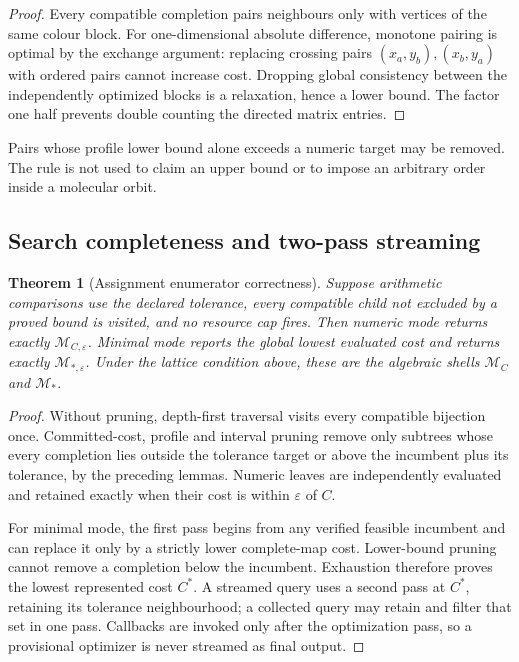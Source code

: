 \documentclass[11pt]{article}
\newtheorem{theorem}{Theorem}[section]
\theoremstyle{definition}
\begin{document}
\begin{proof}
Every compatible completion pairs neighbours only with vertices of the same
colour block.  For one-dimensional absolute difference, monotone pairing is
optimal by the exchange argument: replacing crossing pairs
\((x_a,y_b),(x_b,y_a)\) with ordered pairs cannot increase cost.  Dropping
global consistency between the independently optimized blocks is a
relaxation, hence a lower bound.  The factor one half prevents double counting
the directed matrix entries.
\end{proof}

Pairs whose profile lower bound alone exceeds a numeric target may be removed.
The rule is not used to claim an upper bound or to impose an arbitrary order
inside a molecular orbit.

\subsection{Search completeness and two-pass streaming}

\begin{theorem}[Assignment enumerator correctness]
Suppose arithmetic comparisons use the declared tolerance, every compatible
child not excluded by a proved bound is visited, and no resource cap fires.
Then numeric mode returns exactly \(\mathcal M_{C,\varepsilon}\).  Minimal
mode reports the global lowest evaluated cost and returns exactly
\(\mathcal M_{*,\varepsilon}\).  Under the lattice condition above, these are
the algebraic shells \(\mathcal M_C\) and \(\mathcal M_*\).
\label{thm:si-bnb}
\end{theorem}

\begin{proof}
Without pruning, depth-first traversal visits every compatible bijection once.
Committed-cost, profile and interval pruning remove only subtrees whose every
completion lies outside the tolerance target or above the incumbent plus its
tolerance, by the preceding lemmas.  Numeric leaves are independently
evaluated and retained exactly when their cost is within \(\varepsilon\) of
\(C\).

For minimal mode, the first pass begins from any verified feasible incumbent
and can replace it only by a strictly lower complete-map cost.  Lower-bound
pruning cannot remove a completion below the incumbent.  Exhaustion therefore
proves the lowest represented cost \(C^*\).  A streamed query uses a second
pass at \(C^*\), retaining its tolerance neighbourhood; a collected query may
retain and filter that set in one pass.  Callbacks are invoked only after the
optimization pass, so a provisional optimizer is never streamed as final
output.
\end{proof}
\end{document}
